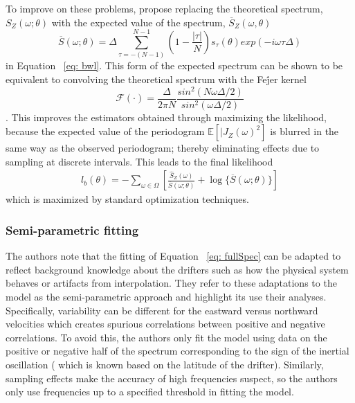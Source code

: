 \documentclass{stat572Style}
\begin{document}
To improve on these problems, \citep{Sykulski2013} propose replacing the theoretical spectrum, $S_{Z}(\omega; \theta)$ with the expected value of the spectrum, $\overline{S}_{Z}(\omega, \theta)$\begin{equation}
\overline{S}(\omega; \theta) = \Delta \sum_{\tau = - (N - 1)}^{N-1} \left(1 - \frac{|\tau|}{N} \right)s_{\tau}(\theta) exp ( - i \omega \tau \Delta)
\end{equation}
in Equation ~\ref{eq: bwl}. This form of the expected spectrum can be shown to be equivalent to convolving the theoretical spectrum with the Fe\'{j}er kernel 
\begin{equation}
\mathcal{F}(\cdot) = \frac{\Delta}{2\pi N} \frac{sin^{2}(N \omega \Delta/2)}{sin^{2}(\omega \Delta /2)} 
\end{equation} \citep{Sykulski2013}. This improves the estimators obtained through maximizing the likelihood, because the expected value of the periodogram $\mathbb{E}[|J_{Z}(\omega)^{2}]$ is blurred in the same way as the observed periodogram; thereby eliminating effects due to sampling at discrete intervals. This leads to the final likelihood
\begin{align}
l_{b}(\theta) = - \sum_{\omega \in \Omega} \left[\frac{\hat{S}_{Z}(\omega)}{\overline{S}(\omega; \theta)} + \log \{ \overline{S} (\omega; \theta) \}\right]
\end{align}
which is maximized by standard optimization techniques.

\subsubsection{Semi-parametric fitting}
The authors note that the fitting of Equation ~\ref{eq: fullSpec} can be adapted to reflect background knowledge about the drifters such as how the physical system behaves or artifacts from interpolation. They refer to these adaptations to the model as the semi-parametric approach and highlight its use  their analyses. Specifically,  variability can be different for the eastward versus northward velocities  which creates spurious correlations between positive and negative correlations. To avoid this, the authors only fit the model using data on the positive or negative half of the spectrum corresponding to the sign of the inertial oscillation ( which is known based on the latitude of the drifter).  Similarly, sampling effects make the accuracy of high frequencies suspect, so the authors only use frequencies up to a specified threshold in fitting the model. 
\end{document}
